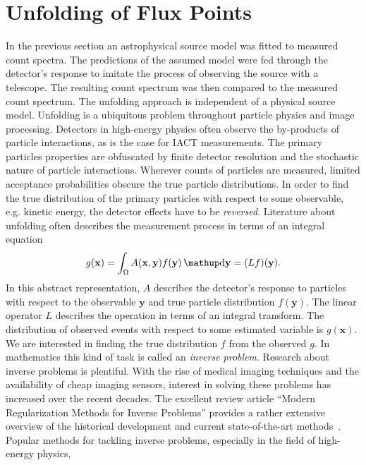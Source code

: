 \section{Unfolding of Flux Points}
\label{sec:unfolding}
In the previous section an astrophysical source model was fitted to measured count spectra.
The predictions of the assumed model were fed through the detector's response to 
imitate the process of observing the source with a telescope. The resulting count spectrum 
was then compared to the measured count spectrum. 
The unfolding approach is independent of a physical source model. 
Unfolding is a ubiquitous problem throughout particle physics and image processing. 
Detectors in high-energy physics often observe the by-products of particle interactions, as is the case for IACT measurements.
The primary particles properties are obfuscated by finite detector resolution and the stochastic nature of particle interactions. 
Wherever counts of particles are measured, limited acceptance probabilities obscure the true particle distributions. 
In order to find the true distribution of the primary particles with respect to some observable, e.g. kinetic energy, the detector 
effects have to be \emph{reversed}. 
Literature about unfolding often describes the measurement process in terms of an integral equation 
\begin{equation}
  \label{eq:inverse}
  g(\mathbf{x}) = \int_{\Omega} A(\mathbf{x}, \mathbf{y})f(\mathbf{y}) \diff{\mathbf{y}} = (Lf)(\mathbf{y}).
\end{equation}
In this abstract representation, $A$ describes the detector's response to particles with respect to the observable $\mathbf{y}$ and true particle 
distribution $f(\mathbf{y})$. The linear operator $L$ describes the operation in terms of an integral transform. 
The distribution of observed events with respect to some estimated variable is $g(\mathbf{x})$.
We are interested in finding the true distribution $f$ from the observed $g$. 
In mathematics this kind of task is called an \emph{inverse problem}. Research about inverse problems is plentiful.
With the rise of medical imaging techniques and the availability of cheap imaging sensors, interest in solving these problems 
has increased over the recent decades. 
The excellent review article \enquote{Modern Regularization Methods for Inverse Problems} provides a rather extensive overview of 
the historical development and current state-of-the-art methods~\cite{benning_inverse_review}.
Popular methods for tackling inverse problems, especially in the field of high-energy physics, 
